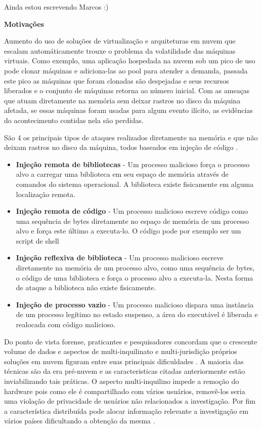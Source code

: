 \documentclass[
	12pt,				%
	openright,			%
	oneside,			%
	a4paper,			%
	english,			%
	french,				%
	spanish,			%
	brazil,				%
	]{abntex2}
\begin{document}
Ainda estou escrevendo Marcos :)

\textbf{Motivações}

Aumento do uso de soluções de virtualização e arquiteturas em nuvem que escalam automáticamente \cite{Amazon2016} trouxe o problema da volatilidade das máquinas virtuais. 
Como exemplo, uma aplicação hospedada na nuvem sob um pico de uso pode clonar máquinas e adiciona-las ao pool para atender a demanda, passada este pico as máquinas que foram
clonadas são despejadas e seus recursos liberados e o conjunto de máquinas retorna ao número inicial. Com as ameaças que atuam diretamente na memória sem deixar rastros 
no disco da máquina afetada, se essas máquinas foram usadas para algum evento ilícito, as evidências do acontecimento contidas nela são perdidas.

São 4 os principais tipos de ataques realizados diretamente na memória e que não deixam rastros no disco da máquina, todos baseados em injeção de código \cite{Case2014}.

\begin{itemize}
 \item \textbf{Injeção remota de bibliotecas} - Um processo malicioso força o processo alvo a carregar uma biblioteca em seu espaço de memória através de comandos do sistema operacional.
 A biblioteca existe fisicamente em alguma localização remota.
 \item \textbf{Injeção remota de código} - Um processo malicioso escreve código como uma sequência de bytes diretamente no espaço de memória de um processo alvo e força este 
 último a executa-lo. O código pode por exemplo ser um script de shell
 \item \textbf{Injeção reflexiva de biblioteca} - Um processo malicioso escreve diretamente na memória de um processo alvo, como uma sequência de bytes, o código de uma biblioteca
 e força o processo alvo a executa-la. Nesta forma de ataque a biblioteca não existe fisicamente.
 \item \textbf{Injeção de processo vazio} - Um processo malicioso dispara uma instância de um processo legítimo no estado suspenso, a área do executável é liberada e realocada com 
 código malicioso.
\end{itemize}

Do ponto de vista forense, praticantes e pesquisadores concordam que o crescente volume de dados e aspectos de multi-inquilinato e multi-jurisdição próprios soluções em
nuvem figuram entre suas principais dificuldades \cite{Bash2015a}. A maioria das técnicas são da era pré-nuvem e as caracteristicas citadas anteriormente estão inviabilizando
tais práticas. O aspecto multi-inquilino impede a remoção do hardware pois como ele é compartilhado com vários usuários, removê-los seria uma violação de privacidade de usuários não relacionados
a investigação. Por fim a característica distribuída pode alocar informação relevante a investigação em vários países dificultando a obtenção da mesma \cite{Dykstra2012a}.
\end{document}
